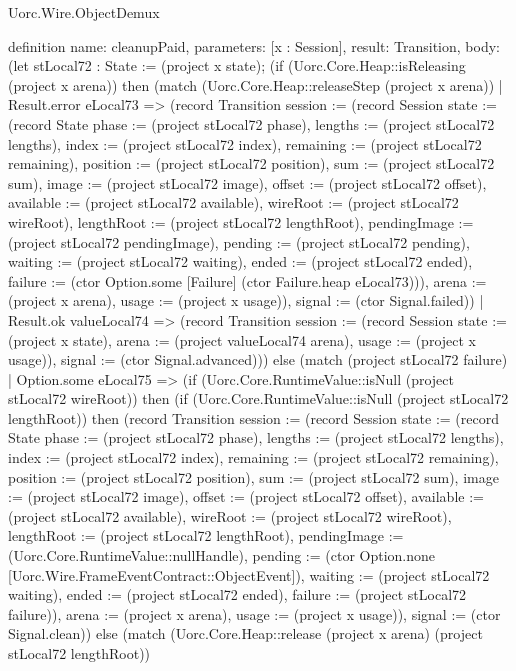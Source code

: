 \begin{lexlean}{Uorc.Wire.ObjectDemux}
\begin{semanticmodule}
definition{
  name: cleanupPaid,
  parameters: [x : Session],
  result: Transition,
  body: (let stLocal72 : State := (project x state); (if (Uorc.Core.Heap::isReleasing (project x arena)) then (match (Uorc.Core.Heap::releaseStep (project x arena))
    | Result.error eLocal73 => (record Transition {session := (record Session {state := (record State {phase := (project stLocal72 phase), lengths := (project stLocal72 lengths), index := (project stLocal72 index), remaining := (project stLocal72 remaining), position := (project stLocal72 position), sum := (project stLocal72 sum), image := (project stLocal72 image), offset := (project stLocal72 offset), available := (project stLocal72 available), wireRoot := (project stLocal72 wireRoot), lengthRoot := (project stLocal72 lengthRoot), pendingImage := (project stLocal72 pendingImage), pending := (project stLocal72 pending), waiting := (project stLocal72 waiting), ended := (project stLocal72 ended), failure := (ctor Option.some [Failure] (ctor Failure.heap eLocal73))}), arena := (project x arena), usage := (project x usage)}), signal := (ctor Signal.failed)})
    | Result.ok valueLocal74 => (record Transition {session := (record Session {state := (project x state), arena := (project valueLocal74 arena), usage := (project x usage)}), signal := (ctor Signal.advanced)})) else (match (project stLocal72 failure)
    | Option.some eLocal75 => (if (Uorc.Core.RuntimeValue::isNull (project stLocal72 wireRoot)) then (if (Uorc.Core.RuntimeValue::isNull (project stLocal72 lengthRoot)) then (record Transition {session := (record Session {state := (record State {phase := (project stLocal72 phase), lengths := (project stLocal72 lengths), index := (project stLocal72 index), remaining := (project stLocal72 remaining), position := (project stLocal72 position), sum := (project stLocal72 sum), image := (project stLocal72 image), offset := (project stLocal72 offset), available := (project stLocal72 available), wireRoot := (project stLocal72 wireRoot), lengthRoot := (project stLocal72 lengthRoot), pendingImage := (Uorc.Core.RuntimeValue::nullHandle), pending := (ctor Option.none [Uorc.Wire.FrameEventContract::ObjectEvent]), waiting := (project stLocal72 waiting), ended := (project stLocal72 ended), failure := (project stLocal72 failure)}), arena := (project x arena), usage := (project x usage)}), signal := (ctor Signal.clean)}) else (match (Uorc.Core.Heap::release (project x arena) (project stLocal72 lengthRoot))
}
\end{semanticmodule}
\end{lexlean}
